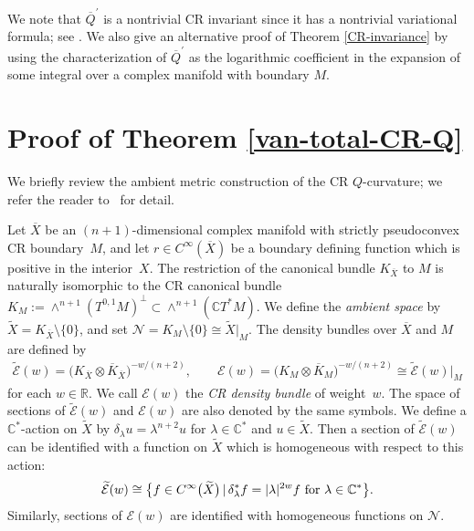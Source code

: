 \documentclass[10pt,a4paper]{amsart}
\numberwithin{equation}{section}
\begin{document}
We note that $\overline{Q}^\prime$ is a nontrivial CR invariant since it has a nontrivial variational formula; see \cite{Hirachi/Marugame/Matsumoto}. We also give an alternative proof of Theorem \ref{CR-invariance} by using the characterization \cite[Theorem~5.6]{Hirachi} of
$\overline{Q}^\prime$ as the logarithmic coef\/f\/icient in the expansion of some integral over a complex manifold with boundary $M$.

\section{Proof of Theorem \ref{van-total-CR-Q}}
We brief\/ly review the ambient metric construction of the CR $Q$-curvature; we refer the reader to~\cite{Fefferman/Hirachi, Hirachi, Hirachi/Marugame/Matsumoto} for detail.

Let $\overline X$ be an $(n+1)$-dimensional complex manifold with strictly pseudoconvex CR boundary~$M$, and let $r\in C^\infty(\overline{X})$ be a boundary def\/ining function which is positive in the interior~$X$. The restriction of the canonical bundle $K_{\overline X}$ to $M$ is naturally isomorphic to the CR canonical bundle $K_M:=\wedge^{n+1}(T^{0, 1}M)^\perp
\subset\wedge^{n+1}(\mathbb{C} T^\ast M)$. We def\/ine the {\it ambient space} by $\widetilde X=K_{\overline X}\setminus\{0\}$, and set
$\mathcal{N}=K_M\setminus\{0\}\cong\widetilde X|_M$. The density bundles over $\overline X$ and $M$ are def\/ined by
\begin{gather*}
\widetilde{\mathcal{E}}(w)=\big(K_{\overline X}\otimes\overline{K}_{\overline X}\big)^{-w/(n+2)}, \qquad
\mathcal{E}(w)=\big(K_M\otimes\overline{K}_M\big)^{-w/(n+2)}\cong\widetilde{\mathcal{E}}(w)|_M
\end{gather*}
for each $w\in\mathbb{R}$. We call $\mathcal{E}(w)$ the {\it CR density bundle} of weight~$w$. The space of sections of $\widetilde{\mathcal{E}}(w)$ and $\mathcal{E}(w)$ are also denoted by the same symbols. We def\/ine a $\mathbb{C}^\ast$-action on $\widetilde X$ by $\delta_\lambda u=
\lambda^{n+2}u$ for $\lambda\in\mathbb{C}^\ast$ and $u\in\widetilde X$. Then a section of $\widetilde{\mathcal{E}}(w)$ can be identif\/ied with a function on $\widetilde X$ which is homogeneous with respect to this action:
\begin{gather*}
\widetilde{\mathcal{E}}(w)\cong \big\{f\in C^\infty\big(\widetilde X\big)\, |\, \delta_\lambda^\ast f=|\lambda|^{2w}f\ {\rm for}\ \lambda\in\mathbb{C}^\ast\big\}.
\end{gather*}
Similarly, sections of $\mathcal{E}(w)$ are identif\/ied with homogeneous functions on $\mathcal{N}$.
\end{document}
